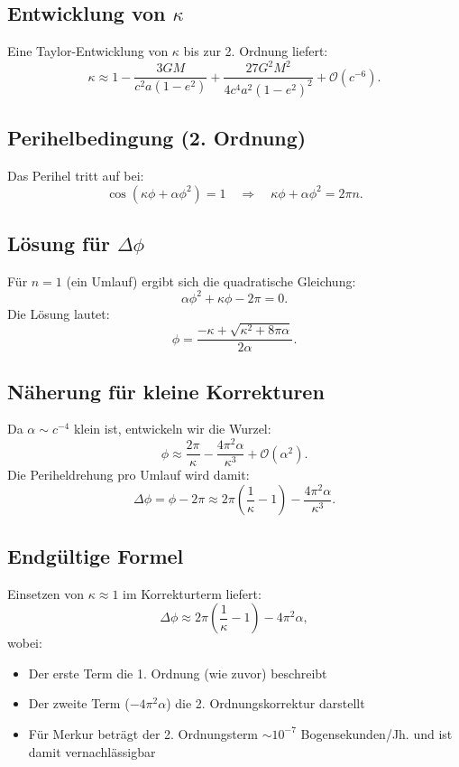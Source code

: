 \subsection{Entwicklung von $\kappa$}
Eine Taylor-Entwicklung von $\kappa$ bis zur 2. Ordnung liefert:
\begin{equation}
\kappa \approx 1 - \frac{3GM}{c^2 a(1 - e^2)} + \frac{27G^2 M^2}{4c^4 a^2 (1 - e^2)^2} + \mathcal{O}(c^{-6}).
\end{equation}

\subsection{Perihelbedingung (2. Ordnung)}
Das Perihel tritt auf bei:
\begin{equation}
\cos\left(\kappa\phi + \alpha\phi^2\right) = 1 \quad \Rightarrow \quad \kappa\phi + \alpha\phi^2 = 2\pi n.
\end{equation}

\subsection{Lösung für $\Delta\phi$}
Für $n=1$ (ein Umlauf) ergibt sich die quadratische Gleichung:
\begin{equation}
\alpha\phi^2 + \kappa\phi - 2\pi = 0.
\end{equation}
Die Lösung lautet:
\begin{equation}
\phi = \frac{-\kappa + \sqrt{\kappa^2 + 8\pi\alpha}}{2\alpha}.
\end{equation}

\subsection{Näherung für kleine Korrekturen}
Da $\alpha \sim c^{-4}$ klein ist, entwickeln wir die Wurzel:
\begin{equation}
\phi \approx \frac{2\pi}{\kappa} - \frac{4\pi^2\alpha}{\kappa^3} + \mathcal{O}(\alpha^2).
\end{equation}
Die Periheldrehung pro Umlauf wird damit:
\begin{equation}
\Delta\phi = \phi - 2\pi \approx 2\pi\left(\frac{1}{\kappa} - 1\right) - \frac{4\pi^2\alpha}{\kappa^3}.
\end{equation}

\subsection{Endgültige Formel}
Einsetzen von $\kappa \approx 1$ im Korrekturterm liefert:
\begin{equation}
\boxed{
\Delta\phi \approx 2\pi\left(\frac{1}{\kappa} - 1\right) - 4\pi^2\alpha
},
\end{equation}
wobei:
\begin{itemize}
\item Der erste Term die 1. Ordnung (wie zuvor) beschreibt
\item Der zweite Term ($-4\pi^2\alpha$) die 2. Ordnungskorrektur darstellt
\item Für Merkur beträgt der 2. Ordnungsterm $\sim 10^{-7}$ Bogensekunden/Jh. und ist damit vernachlässigbar
\end{itemize}

